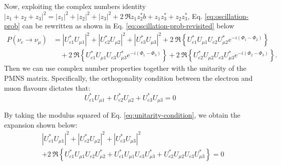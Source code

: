 Now, exploiting the complex numbers identity $|z_1 +z_2 +z_3|^2 = |z_1|^2 + |z_2|^2 + |z_3|^2 + 2~\Re{z_1z_2^*b + z_1z_3^* + z_2z_3^*}$, 
Eq. \ref{eq:oscillation-prob} can be rewritten as shown in Eq. \ref{eq:oscillation-prob-revisited} below
\begin{equation}
    \label{eq:oscillation-prob-revisited}
    \begin{aligned}
        P(\nu_e \to \nu_\mu) &= |U_{e1}^* U_{\mu 1}|^2 + |U_{e2}^* U_{\mu 2}|^2 + |U_{e3}^* U_{\mu 3}|^2 + 2~\Re \left\{ U_{e1}^* U_{\mu 1} U_{e2} U_{\mu 2}^* e^{-i(\Phi_1 - \Phi_2)} \right\} \\
        &\quad + 2~\Re \left\{ U_{e1}^* U_{\mu 1} U_{e3} U_{\mu 3}^* e^{-i(\Phi_1 - \Phi_3)} \right\} + 2~\Re \left\{ U_{e2}^* U_{\mu 2} U_{e3} U_{\mu 3}^* e^{-i(\Phi_2 - \Phi_3)} \right\}.
    \end{aligned}
\end{equation}
Then we can use complex number properties together with the unitarity of the PMNS matrix. 
Specifically, the orthogonality condition between the electron and muon flavours dictates that:
\begin{equation}
    \label{eq:unitarity-condition}
    U_{e1}^* U_{\mu 1} + U_{e2}^* U_{\mu 2} + U_{e3}^* U_{\mu 3} = 0
\end{equation}

By taking the modulus squared of Eq. \ref{eq:unitarity-condition}, we obtain the expansion shown below:
\begin{equation}
    \label{eq:unitarity-squared}
    \begin{aligned}
        &|U_{e1}^* U_{\mu 1}|^2 + |U_{e2}^* U_{\mu 2}|^2 + |U_{e3}^* U_{\mu 3}|^2 \\
        &+ 2~\Re \left\{ U_{e1}^* U_{\mu 1} U_{e2} U_{\mu 2}^* + U_{e1}^* U_{\mu 1} U_{e3} U_{\mu 3}^* + U_{e2}^* U_{\mu 2} U_{e3} U_{\mu 3}^* \right\} = 0
    \end{aligned}
\end{equation}

